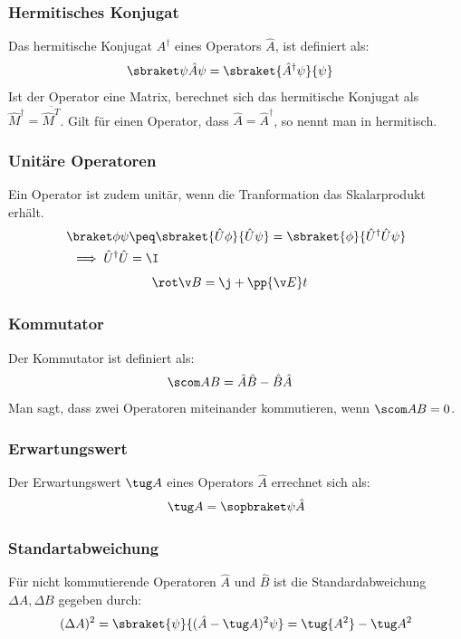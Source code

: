 \documentclass[twocolumn, unnumberedsubsub]{summery_3.1}
\begin{document}
\subsubsection{Hermitisches Konjugat}
Das hermitische Konjugat \(A^\dagger\) eines Operators \(\hat A\), ist definiert als:
\begin{align*}
    \sbraket\psi{\hat A\psi} &= \sbraket{\hat A^\dagger\psi}{\psi}
\end{align*}
Ist der Operator eine Matrix, berechnet sich das hermitische Konjugat als \(\hat M^\dagger = \overline{\hat M ^T}\).
Gilt für einen Operator, dass \(\hat A = \hat A^\dagger\), so nennt man in hermitisch.  

\subsubsection{Unitäre Operatoren}
Ein Operator ist zudem unitär, wenn die Tranformation das Skalarprodukt erhält.
\begin{align*}
    \braket\phi\psi &\peq \sbraket{\hat U \phi}{ \hat U \psi}
    = \sbraket{\phi}{\hat U^\dagger \hat U \psi}\\
    \implies \hat U^\dagger \hat U &= \I
\end{align*}
\begin{align*}
    \rot \v B &= \j + \pp{\v E}t
\end{align*}
\subsubsection{Kommutator}
Der Kommutator ist definiert als:
\begin{align*}
    \scom AB &= \hat A \hat B - \hat B \hat A
\end{align*}
Man sagt, dass zwei Operatoren miteinander kommutieren, wenn \(\scom AB = 0\).  


\subsubsection{Erwartungswert}
Der Erwartungswert \(\tug A\) eines Operators \(\hat A\) errechnet sich als:
\begin{align*}
    \tug A = \sopbraket\psi {\hat A}
\end{align*}

\subsubsection{Standartabweichung}
Für nicht kommutierende Operatoren \(\hat A\) und \(\hat B\) ist die Standardabweichung \(\Delta A,\Delta B\)
gegeben durch:
\begin{align*}
    (\Delta A)^2 &= \sbraket{\psi}{(\hat A - \tug A)^2\psi}
    = \tug {A^2}- \tug A^2\\
\end{align*}
\end{document}
